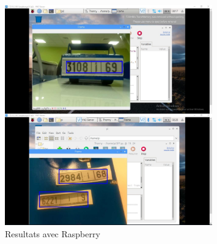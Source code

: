 \begin{frame}
\begin{columns}
\begin{column}{6cm}
\begin{figure}
\begin{overprint}
            \centering\includegraphics[width=0.8\textwidth]{figures/Stream.PNG}\caption{Resultats avec Raspberry}
        \end{overprint}
    \end{figure}
\end{column}
\end{columns}
\end{frame}